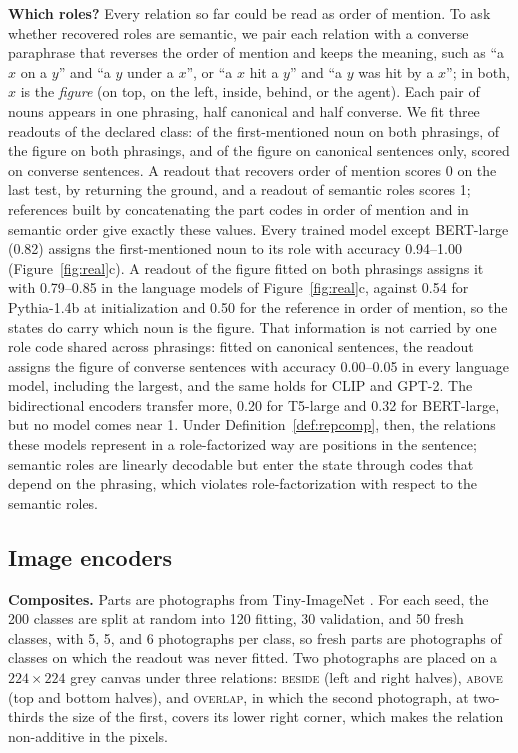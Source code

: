 \documentclass[10pt]{article}
\theoremstyle{plain}
\theoremstyle{remark}
\begin{document}
\textbf{Which roles?} Every relation so far could be read as order of mention. To ask whether recovered roles are semantic, we pair each relation with a converse paraphrase that reverses the order of mention and keeps the meaning, such as ``a $x$ on a $y$'' and ``a $y$ under a $x$'', or ``a $x$ hit a $y$'' and ``a $y$ was hit by a $x$''; in both, $x$ is the \emph{figure} (on top, on the left, inside, behind, or the agent). Each pair of nouns appears in one phrasing, half canonical and half converse. We fit three readouts of the declared class: of the first-mentioned noun on both phrasings, of the figure on both phrasings, and of the figure on canonical sentences only, scored on converse sentences. A readout that recovers order of mention scores 0 on the last test, by returning the ground, and a readout of semantic roles scores 1; references built by concatenating the part codes in order of mention and in semantic order give exactly these values. Every trained model except BERT-large (0.82) assigns the first-mentioned noun to its role with accuracy 0.94--1.00 (Figure~\ref{fig:real}c). A readout of the figure fitted on both phrasings assigns it with 0.79--0.85 in the language models of Figure~\ref{fig:real}c, against 0.54 for Pythia-1.4b at initialization and 0.50 for the reference in order of mention, so the states do carry which noun is the figure. That information is not carried by one role code shared across phrasings: fitted on canonical sentences, the readout assigns the figure of converse sentences with accuracy 0.00--0.05 in every language model, including the largest, and the same holds for CLIP and GPT-2. The bidirectional encoders transfer more, 0.20 for T5-large and 0.32 for BERT-large, but no model comes near 1. Under Definition~\ref{def:repcomp}, then, the relations these models represent in a role-factorized way are positions in the sentence; semantic roles are linearly decodable but enter the state through codes that depend on the phrasing, which violates role-factorization with respect to the semantic roles.

\subsection{Image encoders}
\label{sec:vision}

\textbf{Composites.} Parts are photographs from Tiny-ImageNet \citep{le2015tiny}. For each seed, the 200 classes are split at random into 120 fitting, 30 validation, and 50 fresh classes, with 5, 5, and 6 photographs per class, so fresh parts are photographs of classes on which the readout was never fitted. Two photographs are placed on a $224 \times 224$ grey canvas under three relations: \textsc{beside} (left and right halves), \textsc{above} (top and bottom halves), and \textsc{overlap}, in which the second photograph, at two-thirds the size of the first, covers its lower right corner, which makes the relation non-additive in the pixels.
\end{document}

